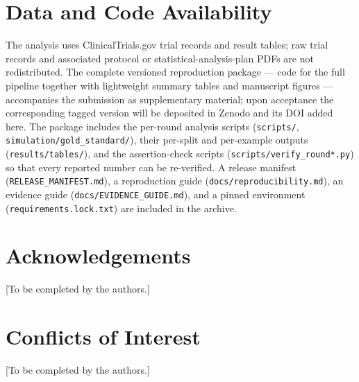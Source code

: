 \documentclass[11pt]{article}
\begin{document}
\section*{Data and Code Availability}
{\sloppy
The analysis uses ClinicalTrials.gov trial records and result tables; raw trial
records and associated protocol or statistical-analysis-plan PDFs are not
redistributed. The complete versioned reproduction package --- code for
the full pipeline together with lightweight summary tables and
manuscript figures --- accompanies the submission as supplementary
material; upon acceptance the corresponding tagged version will be
deposited in Zenodo and its DOI added here. The package includes the
per-round
analysis scripts (\texttt{scripts/},
\texttt{simulation/gold\_standard/}), their per-split and per-example
outputs (\texttt{results/tables/}), and the assertion-check scripts
(\texttt{scripts/verify\_round*.py}) so that every reported number can
be re-verified. A release
manifest (\texttt{RELEASE\_MANIFEST.md}), a reproduction guide
(\texttt{docs/rep\-ro\-du\-ci\-bi\-li\-ty.md}), an evidence guide
(\texttt{docs/EVIDENCE\_GUIDE.md}), and a pinned environment
(\texttt{requirements.lock.txt}) are included in the archive.
\par}

\section*{Acknowledgements}
[To be completed by the authors.]

\section*{Conflicts of Interest}
[To be completed by the authors.]
\end{document}
